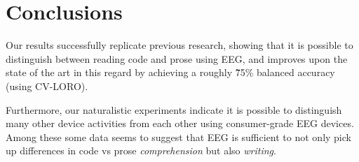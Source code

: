 \section{Conclusions}

Our results successfully replicate previous research, showing that it is possible to distinguish between reading code and prose using EEG, and improves upon the state of the art in this regard by achieving a roughly \~75\% balanced accuracy (using CV-LORO).

Furthermore, our naturalistic experiments indicate it is possible to distinguish many other device activities from each other using consumer-grade EEG devices. Among these some data seems to suggest that EEG is sufficient to not only pick up differences in code vs prose \emph{comprehension} but also \emph{writing}.

